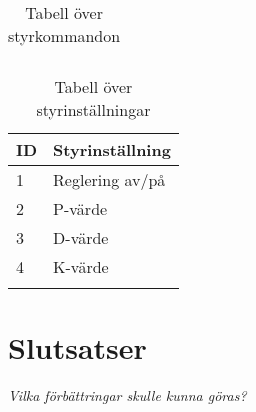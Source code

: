 \documentclass[11pt]{article}
\begin{document}
\begin{flushleft}
\begin{longtable}[l]{| l | l |}
\caption{Tabell över styrkommandon}\label{styrtab}
\end{longtable}

\begin{longtable}[l]{| l | l |} \hline
\textbf{ID} & \textbf{Styrinställning} \\ \hline 
1 & Reglering av/på \\ \hline
2 & P-värde \\ \hline
3 & D-värde \\ \hline
4 & K-värde \\ \hline

\caption{Tabell över styrinställningar}\label{styrinsttab}
\end{longtable}

\section{Slutsatser}
\textit{Vilka förbättringar skulle kunna göras?}

\pagebreak
{}



\pagebreak


\appendix

\end{flushleft}
\end{document}
